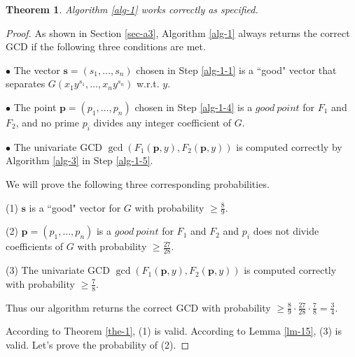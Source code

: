 \documentclass[final,20pt]{elsarticle}
\newtheorem{theorem}{Theorem}[section]
\begin{document}
\begin{theorem}
Algorithm \ref{alg-1} works correctly as specified.
\end{theorem}
\begin{proof}
As shown in Section \ref{sec-a3}, Algorithm \ref{alg-1} always returns the correct GCD if the following three conditions are met.

$\bullet$ The vector $\mathbf{s}=(s_1,\dots,s_n)$ chosen in Step \ref{alg-1-1} is a ``good" vector that separates $G(x_1y^{s_1},\dots,x_ny^{s_n})$ w.r.t. $y$.

$\bullet$ The point $\mathbf{p}=(p_1,\dots,p_n)$ chosen in Step \ref{alg-1-4} is  a $good\ point$ for $F_1$ and $F_2$, and no prime $p_i$
divides any integer coefficient of $G$.

$\bullet$ The univariate GCD $\gcd(F_1(\mathbf{p},y),F_2(\mathbf{p},y))$ is computed correctly by Algorithm \ref{alg-3} in Step \ref{alg-1-5}.

\noindent
We will prove the following three corresponding probabilities.

(1) $\mathbf{s}$ is a ``good" vector for  $G$ with probability $\geq \frac89$.

(2) $\mathbf{p}=(p_1,\dots,p_n)$ is a $good\ point$ for $F_1$ and $F_2$ and $p_i$ does not divide coefficients of $G$ with probability $\geq \frac{27}{28}$.


(3) The univariate GCD $\gcd(F_1(\mathbf{p},y),F_2(\mathbf{p},y))$ is computed correctly with probability $\geq \frac78$.

Thus our algorithm returns the correct GCD with probability $\geq \frac89\cdot \frac{27}{28}\cdot\frac{7}{8}=\frac34$.
%



According to Theorem \ref{the-1}, (1) is valid. According to Lemma \ref{lm-15}, (3) is valid.
Let's prove the probability of (2).


\end{proof}
\end{document}
